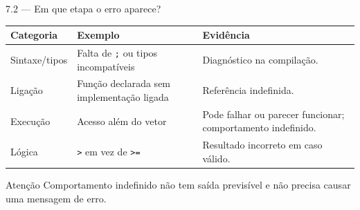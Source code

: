 \begin{frame}{7.2 — Em que etapa o erro aparece?}
\small
\begin{tabularx}{\textwidth}{>{\raggedright\arraybackslash}p{2.2cm}>{\raggedright\arraybackslash}X>{\raggedright\arraybackslash}X}
\toprule
Categoria & Exemplo & Evidência \\
\midrule
Sintaxe/tipos & Falta de \texttt{;} ou tipos incompatíveis & Diagnóstico na compilação. \\
Ligação & Função declarada sem implementação ligada & Referência indefinida. \\
Execução & Acesso além do vetor & Pode falhar ou parecer funcionar; comportamento indefinido. \\
Lógica & \texttt{>} em vez de \texttt{>=} & Resultado incorreto em caso válido. \\
\bottomrule
\end{tabularx}
\begin{alertblock}{Atenção}
Comportamento indefinido não tem saída previsível e não precisa causar uma mensagem de erro.
\end{alertblock}
\end{frame}
